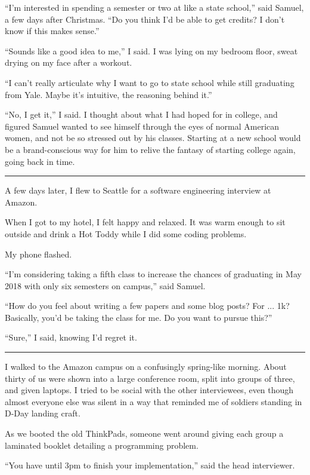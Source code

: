 ``I'm interested in spending a semester or two at like a state school,'' said
Samuel, a few days after Christmas.  ``Do you think I'd be able to get credits?
I don't know if this makes sense.''

``Sounds like a good idea to me,'' I said.  I was lying on my bedroom floor,
sweat drying on my face after a workout.  

``I can't really articulate why I want to go to state school while still
graduating from Yale.   Maybe it's intuitive, the reasoning behind it.'' 

``No, I get it,'' I said.  I thought about what I had hoped for in college, and
figured Samuel wanted to see himself through the eyes of normal American women,
and not be so stressed out by his classes.  Starting at a new school would be a
brand-conscious way for him to relive the fantasy of starting college again,
going back in time. 

\plainfancybreak{12pt}{2}{* * *}

A few days later, I flew to Seattle for a software engineering interview at
Amazon.

When I got to my hotel, I felt happy and relaxed. It was warm enough to sit
outside and drink a Hot Toddy while I did some coding problems. 

My phone flashed.

``I'm considering taking a fifth class to increase the chances of graduating in
May 2018 with only six semesters on campus,'' said Samuel.  

``How do you feel about writing a few papers and some blog posts?  For ... 1k?
Basically, you'd be taking the class for me.  Do you want to pursue this?'' 

``Sure,'' I said, knowing I'd regret it.

\plainfancybreak{12pt}{2}{* * *}

I walked to the Amazon campus on a confusingly spring-like morning.  About
thirty of us were shown into a large conference room, split into groups of
three, and given laptops.  I tried to be social with the other interviewees,
even though almost everyone else was silent in a way that reminded me of
soldiers standing in D-Day landing craft.

As we booted the old ThinkPads, someone went around giving each group a
laminated booklet detailing a programming problem. 

``You have until 3pm to finish your implementation,'' said the head interviewer.

